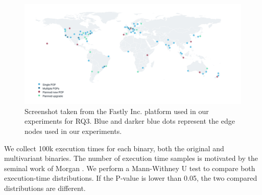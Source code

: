 \begin{figure}[h]
    \centering
    \includegraphics[width=\linewidth]{diagrams/pops.png}
    \caption{Screenshot taken from the Fastly Inc. platform used in our experiments for RQ3. Blue and darker blue dots represent the edge nodes used in our experiments.}
    \label{diagrams:protocol:rq3:map}
\end{figure}



We collect 100k execution times for each binary, both the original and multivariant binaries. The number of execution time samples is motivated by the seminal work of Morgan \etal \cite{morgan2015web}. 
We perform a Mann-Withney U test \cite{mann1947} to compare both execution-time distributions. 
If the P-value is lower than 0.05, the two compared distributions are different.